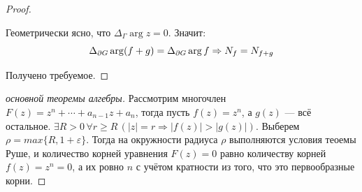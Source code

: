 \begin{proof}
\begin{center}
	\end{center}
	
	Геометрически ясно, что $\Delta_\Gamma\arg{z} = 0$. Значит:
	\[\Delta_{\partial G}\arg (f+g) = \Delta_{\partial G}\arg f \Rightarrow N_f = N_{f+g}\]
	
	Получено требуемое.
\end{proof}

\begin{proof}[основной теоремы алгебры]
    Рассмотрим многочлен \(F(z) = z^n+\cdots+a_{n-1}z+a_n\), тогда пусть \(f(z)=z^n\), а \(g(z)\) --- всё остальное. \(\exists R>0\,\forall r \geqslant R\, \left(|z| =r \Rightarrow |f(z)| > |g(z)|\right)\). Выберем \(\rho = max\{R, 1 + \varepsilon\}\). Тогда на окружности радиуса \(\rho\) выполняются условия теоемы Руше, и количество корней уравнения \(F(z)=0\) равно количеству корней \(f(z)=z^n=0\), а их ровно \(n\) с учётом кратности из того, что это первообразные корни.
\end{proof}